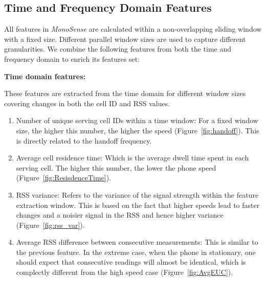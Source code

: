 \documentclass[conference]{IEEEtran}
\def \sys {\textit{MonoSense}}
\begin{document}
\subsection{Time and Frequency Domain Features}\label{sec:features}
 All features in \sys{} are calculated within a non-overlapping sliding window with a fixed size. Different parallel window sizes are used to capture different granularities. We combine the following features from both the time and frequency domain to enrich its features set:


\noindent \textbf{Time domain features:}

These features are extracted from the time domain for different window sizes covering changes in both the cell ID and RSS values.
\begin{enumerate}
\item Number of unique serving cell IDs within a time window: For a fixed window size, the higher this number, the higher the speed (Figure~\ref{fig:handoff}). This is directly related to the handoff frequency. 
\item Average cell residence time: Which is the average dwell time spent in each serving cell. The higher this number, the lower the phone speed (Figure~\ref{fig:ResisdenceTime}).

\item  RSS variance: Refers to the variance of the signal strength within the feature extraction window. This is based on the fact that higher speeds lead to faster changes and a noisier signal in the RSS and hence higher variance \cite{muthukrishnan2007sensing} (Figure~\ref{fig:rss_var}).


\item Average RSS difference between consecutive measurements: This is similar to the previous feature. In the extreme case, when the phone in stationary, one should expect that consecutive readings will almost be identical, which is complectly different from the high speed case (Figure~\ref{fig:AvgEUC}).

	
	
\end{enumerate}
\end{document}
